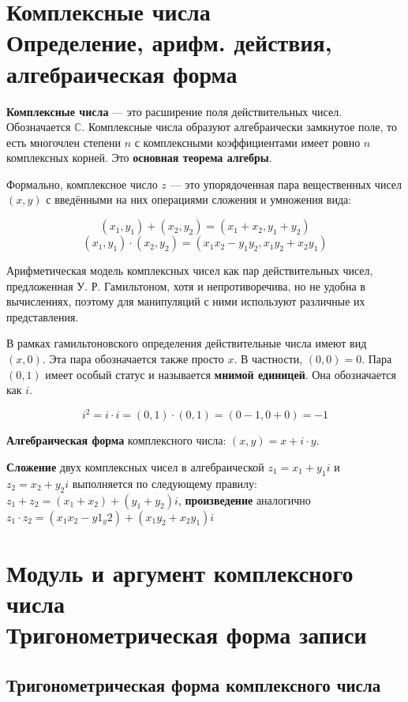 \section{Комплексные числа\\ {\normalfont Определение, арифм. действия, алгебраическая форма}}

\textbf{Комплексные числа} — это расширение поля действительных чисел. Обозначается $\mathbb {C}$. Комплексные числа образуют алгебраически замкнутое поле, то есть многочлен степени $n$ с комплексными коэффициентами имеет ровно $n$ комплексных корней. Это \textbf{основная теорема алгебры}.

Формально, комплексное число $z$ — это упорядоченная пара вещественных чисел $(x, y)$ с введёнными на них операциями сложения и умножения вида:

$$(x_1, y_1) + (x_2, y_2) = (x_1 + x_2, y_1 + y_2)$$
$$(x_1, y_1) \cdot (x_2, y_2) = (x_1x_2 - y_1y_2, x_1y_2 + x_2y_1)$$

Арифметическая модель комплексных чисел как пар действительных чисел, предложенная У. Р. Гамильтоном, хотя и непротиворечива, но не удобна в вычислениях, поэтому для манипуляций с ними используют различные их представления.

В рамках гамильтоновского определения действительные числа имеют вид $(x, 0)$. Эта пара обозначается также просто $x$. В частности, $(0, 0) = 0$. Пара $(0, 1)$ имеет особый статус и называется \textbf{мнимой единицей}. Она обозначается как $i$.

$$i^2 = i\cdot i = (0, 1) \cdot (0, 1) = (0 - 1, 0 + 0) = -1$$

\textbf{Алгебраическая форма} комплексного числа: $(x, y) = x + i\cdot y$.

\textbf{Сложение} двух комплексных чисел в алгебраической $z_1 = x_1 + y_1i$ и $z_2 = x_2 + y_2i$ выполняется по следующему правилу: $z_1 + z_2 = (x_1 + x_2) + (y_1 + y_2)i$, \textbf{произведение} аналогично $z_1 \cdot z_2 = (x_1x_2 - y1_y2) + (x_1y_2 + x_2y_1)i$

\section{Модуль и аргумент комплексного числа\\ {\normalfont Тригонометрическая форма записи}}
\subsection{Тригонометрическая форма комплексного числа}

